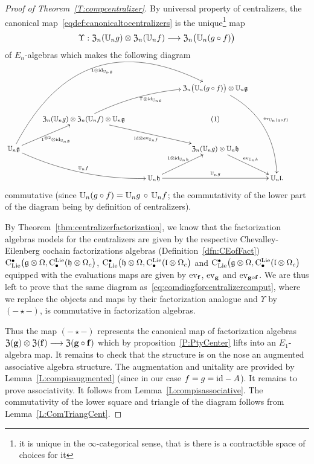 \documentclass[11pt]{amsart}
\numberwithin{equation}{section}
\begin{document}
\begin{proof}[Proof of Theorem~\ref{T:compcentralizer}]
By universal property of centralizers, the canonical map~\eqref{eqdef:canonicaltocentralizers}  
is the unique\footnote{it is unique in the $\infty$-categorical 
sense, that is there is a contractible space of choices for it} map 
\[ \Upsilon: {\frak Z}_n(\mathbb U_n g) \otimes {\frak Z}_n(\mathbb U_n f) \longrightarrow {\frak Z}_n\big(\mathbb U_n (g\circ f)\big)\] 
of $E_n$-algebras which makes the following diagram
\begin{equation}\label{eq:comdiagforcentralizercomput}\small
 \xymatrix{
&   &&  
{\frak Z}_n\big(\UU_n (g\circ f) \big) \otimes  \UU_n \fg  \ar@/^{2pc}/[dddr]^{\ev_{\UU_n (g\circ f)}}\\
&{\frak Z}_n(\UU_n g) \otimes  {\frak Z}_n(\UU_n f) \otimes \UU_n \fg \ar@/^{1pc}/[rru]_{ \Upsilon \otimes \id_{\UU_n \fg}} \ar[rrd]_{\id\otimes \ev_{\UU_n f}}
&& (1)
& & \\
\UU_n \fg \ar[ur]_{1^{\otimes 2}\otimes \id_{\UU_n \fg}} \ar@/_{1pc}/[rrd]^{\UU_n f} \ar@/^{6pc}/[rrruu]_{1\otimes \id_{\UU_n \fg}} &&&
{\frak Z}_n(\UU_n g) \otimes \UU_n \fh \ar[rd]^{\ev_{\UU_n h}}  &\\
&& \UU_n \fh \ar[rr]^{\UU_n g} \ar[ur]^{1\otimes \id_{\UU_n \fh}} && \UU_n \fl .}
\end{equation}
commutative (since $\mathbb U_n (g\circ f) = \mathbb U_n g\, \circ \, \mathbb U_n f $;  the commutativity of the lower part of the diagram being by definition of centralizers).

By Theorem~\ref{thm:centralizerfactorization}, we know that the factorization algebras models for the centralizers are given by the respective Chevalley-Eilenberg cochain factorizations algebras 
(Definition~\ref{dfn:CEofFact}) ${\rm C}_{\rm Lie}^\bullet\big(\mathfrak g \otimes \Omega, {\rm C}^{\rm Lie}_\bullet(\mathfrak h \otimes \Omega_c  \big) $, 
${\rm C}_{\rm Lie}^\bullet\big(\mathfrak h \otimes \Omega, {\rm C}^{\rm Lie}_\bullet(\mathfrak l \otimes \Omega_c  \big) $ and ${\rm C}_{\rm Lie}^\bullet\big(\mathfrak g \otimes \Omega, {\rm C}^{\rm Lie}_\bullet(\mathfrak l \otimes \Omega_c  \big) $ 
equipped with the evaluations maps are given by ${\rm ev}_{\mathbf{f}}$, ${\rm ev}_{\mathbf{g}}$ and ${\rm ev}_{\mathbf{g}\circ \mathbf{f}}$. We are thus left 
to prove that the same  diagram as~\eqref{eq:comdiagforcentralizercomput}, where we replace the objects and maps by their factorization analogue and $\Upsilon$
by $(-\star-)$, is commutative in factorization algebras.

Thus the map $(-\star-)$ represents the canonical map of factorization algebras 
$ {\frak Z}(\mathbf{g}) \otimes {\frak Z}(\mathbf{f}) \longrightarrow {\frak Z}(\mathbf{g}\circ \mathbf{f})$ which by proposition~\ref{P:PtyCenter} lifts
into an $E_1$-algebra map. It remains to check that the structure is on the nose an augmented associative algebra structure.
The augmentation and unitality are provided by Lemma~\ref{L:compisaugmented} (since in our case $f=g={\rm id}-A$). 
It remains to prove associativity. It follows from Lemma~\ref{L:compisassociative}. 
The commutativity of the lower square and triangle of the diagram follows from Lemma~\ref{L:ComTriangCent}.
\end{proof}
\end{document}

